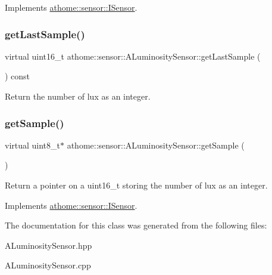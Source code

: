 Implements \mbox{\hyperlink{classathome_1_1sensor_1_1_i_sensor_a95785b54ffe3a8f7e48c81b5732e3b9f}{athome\+::sensor\+::\+I\+Sensor}}.

\mbox{\label{classathome_1_1sensor_1_1_a_luminosity_sensor_a1cc3cee76cd76486c6e6b51ac484cb2a}} 
\subsubsection{\texorpdfstring{get\+Last\+Sample()}{getLastSample()}}
{\footnotesize\ttfamily virtual uint16\+\_\+t athome\+::sensor\+::\+A\+Luminosity\+Sensor\+::get\+Last\+Sample (\begin{DoxyParamCaption}{ }\end{DoxyParamCaption}) const\hspace{0.3cm}{\ttfamily [pure virtual]}}

Return the number of lux as an integer. \mbox{\label{classathome_1_1sensor_1_1_a_luminosity_sensor_a299491729362d34f474094dfd10eb310}} 
\subsubsection{\texorpdfstring{get\+Sample()}{getSample()}}
{\footnotesize\ttfamily virtual uint8\+\_\+t$\ast$ athome\+::sensor\+::\+A\+Luminosity\+Sensor\+::get\+Sample (\begin{DoxyParamCaption}{ }\end{DoxyParamCaption})\hspace{0.3cm}{\ttfamily [pure virtual]}}

Return a pointer on a uint16\+\_\+t storing the number of lux as an integer. 

Implements \mbox{\hyperlink{classathome_1_1sensor_1_1_i_sensor_a2513fd8acc5d8251439330ca0e78cf04}{athome\+::sensor\+::\+I\+Sensor}}.



The documentation for this class was generated from the following files\+:\begin{DoxyCompactItemize}
\item 
A\+Luminosity\+Sensor.\+hpp\item 
A\+Luminosity\+Sensor.\+cpp\end{DoxyCompactItemize}
